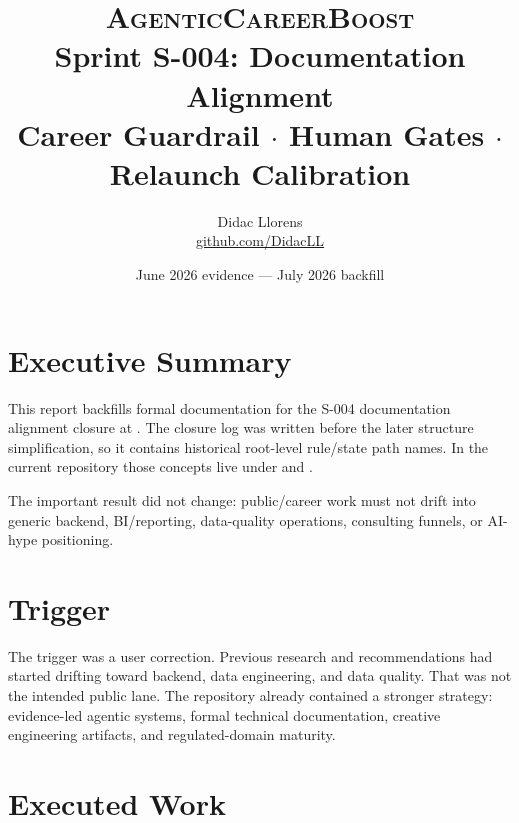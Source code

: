 \documentclass[a4paper,11pt,openany]{report}
\title{%
  \textsc{AgenticCareerBoost}\\[0.4em]
  \Large Sprint S-004: Documentation Alignment\\[0.3em]
  \large Career Guardrail $\cdot$ Human Gates $\cdot$ Relaunch Calibration%
}
\author{Didac Llorens \\ \small \href{https://github.com/DidacLL}{github.com/DidacLL}}
\date{June 2026 evidence --- July 2026 backfill}
\begin{document}
\maketitle
\tableofcontents
\newpage

\chapter{Executive Summary}


This report backfills formal documentation for the S-004 documentation alignment
closure at . The
closure log was written before the later structure simplification, so it
contains historical root-level rule/state path names. In the current repository
those concepts live under
 and
.

The important result did not change: public/career work must not drift into
generic backend, BI/reporting, data-quality operations, consulting funnels, or
AI-hype positioning.

\chapter{Trigger}

The trigger was a user correction. Previous research and recommendations had
started drifting toward backend, data engineering, and data quality. That was
not the intended public lane. The repository already contained a stronger
strategy: evidence-led agentic systems, formal technical documentation,
creative engineering artifacts, and regulated-domain maturity.

\chapter{Executed Work}
\end{document}
